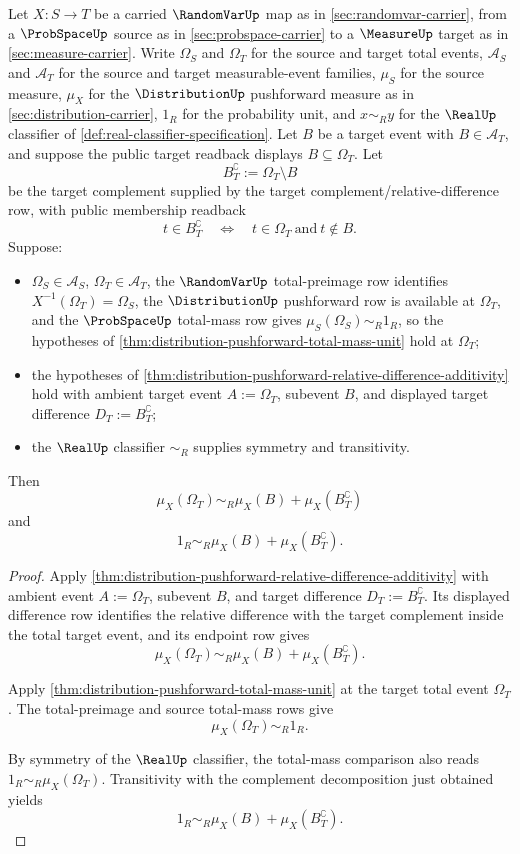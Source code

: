 \begin{theorem}
\label{thm:distribution-complement-mass-decomposition}
Let $X:S\to T$ be a carried $\RandomVarUp$ map as in \autoref{sec:randomvar-carrier}, from a $\ProbSpaceUp$ source as in \autoref{sec:probspace-carrier} to a $\MeasureUp$ target as in \autoref{sec:measure-carrier}. Write $\Omega_S$ and $\Omega_T$ for the source and target total events, $\mathcal{A}_S$ and $\mathcal{A}_T$ for the source and target measurable-event families, $\mu_S$ for the source measure, $\mu_X$ for the $\DistributionUp$ pushforward measure as in \autoref{sec:distribution-carrier}, $1_R$ for the probability unit, and $x\sim_R y$ for the $\RealUp$ classifier of \autoref{def:real-classifier-specification}. Let $B$ be a target event with $B\in\mathcal{A}_T$, and suppose the public target readback displays $B\subseteq\Omega_T$. Let
$$
B_T^{\complement}:=\Omega_T\setminus B
$$
be the target complement supplied by the target complement/relative-difference row, with public membership readback
$$
t\in B_T^{\complement}\quad\Longleftrightarrow\quad t\in\Omega_T\ \text{and}\ t\notin B.
$$
Suppose:
\begin{itemize}
\item $\Omega_S\in\mathcal{A}_S$, $\Omega_T\in\mathcal{A}_T$, the $\RandomVarUp$ total-preimage row identifies $X^{-1}(\Omega_T)=\Omega_S$, the $\DistributionUp$ pushforward row is available at $\Omega_T$, and the $\ProbSpaceUp$ total-mass row gives $\mu_S(\Omega_S)\sim_R1_R$, so the hypotheses of \autoref{thm:distribution-pushforward-total-mass-unit} hold at $\Omega_T$;
\item the hypotheses of \autoref{thm:distribution-pushforward-relative-difference-additivity} hold with ambient target event $A:=\Omega_T$, subevent $B$, and displayed target difference $D_T:=B_T^{\complement}$;
\item the $\RealUp$ classifier $\sim_R$ supplies symmetry and transitivity.
\end{itemize}
Then
$$
\mu_X(\Omega_T)\sim_R\mu_X(B)+\mu_X(B_T^{\complement})
$$
and
$$
1_R\sim_R\mu_X(B)+\mu_X(B_T^{\complement}).
$$
\end{theorem}
\begin{proof}
Apply \autoref{thm:distribution-pushforward-relative-difference-additivity} with ambient event $A:=\Omega_T$, subevent $B$, and target difference $D_T:=B_T^{\complement}$. Its displayed difference row identifies the relative difference with the target complement inside the total target event, and its endpoint row gives
$$
\mu_X(\Omega_T)\sim_R\mu_X(B)+\mu_X(B_T^{\complement}).
$$

Apply \autoref{thm:distribution-pushforward-total-mass-unit} at the target total event $\Omega_T$. The total-preimage and source total-mass rows give
$$
\mu_X(\Omega_T)\sim_R1_R.
$$

By symmetry of the $\RealUp$ classifier, the total-mass comparison also reads $1_R\sim_R\mu_X(\Omega_T)$. Transitivity with the complement decomposition just obtained yields
$$
1_R\sim_R\mu_X(B)+\mu_X(B_T^{\complement}).
$$
\end{proof}

